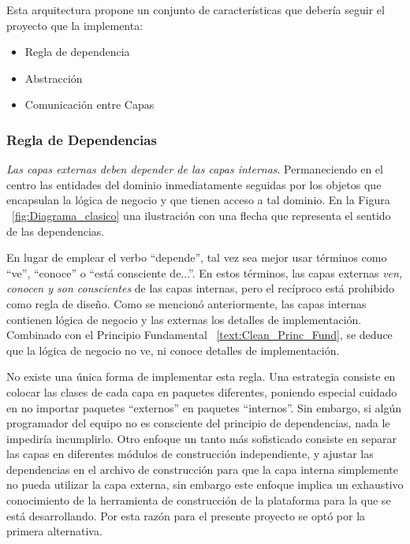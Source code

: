 Esta arquitectura propone un conjunto de características que debería seguir el proyecto que la implementa:

\begin{itemize}
	\item Regla de dependencia
	\item Abstracción
	\item Comunicación entre Capas
\end{itemize}
\subsubsection{Regla de Dependencias}
\emph{Las capas externas deben depender de las capas internas}. Permaneciendo en el centro las entidades del dominio inmediatamente seguidas por los objetos que encapsulan la lógica de negocio y que tienen acceso a tal dominio.  En la Figura ~\ref{fig:Diagrama_clasico} una ilustración con una flecha que representa el sentido de las dependencias. 

En lugar de emplear el verbo ``depende'', tal vez sea mejor usar términos como ``ve'', ``conoce'' o ``está consciente de...''. En estos términos, las capas externas \emph{ven, conocen y son conscientes} de las capas internas, pero el recíproco está prohibido como regla de diseño. Como se mencionó anteriormente, las capas internas contienen lógica de negocio y las externas los detalles de implementación. Combinado con el Principio Fundamental ~\ref{text:Clean_Princ_Fund}, se deduce que la lógica de negocio no ve, ni conoce detalles de implementación.

No existe una única forma de implementar esta regla. Una estrategia consiste en colocar las clases de cada capa en paquetes diferentes, poniendo especial cuidado en no importar paquetes ``externos'' en paquetes ``internos''. Sin embargo, si algún programador del equipo no es consciente del principio de dependencias, nada le impediría incumplirlo. Otro enfoque un tanto más sofisticado consiste en separar las capas en diferentes módulos de construcción independiente, y ajustar las dependencias en el archivo de construcción para que la capa interna simplemente no pueda utilizar la capa externa, sin embargo este enfoque implica un exhaustivo conocimiento de la herramienta de construcción de la plataforma para la que se está desarrollando. Por esta razón para el presente proyecto se optó por la primera alternativa.

